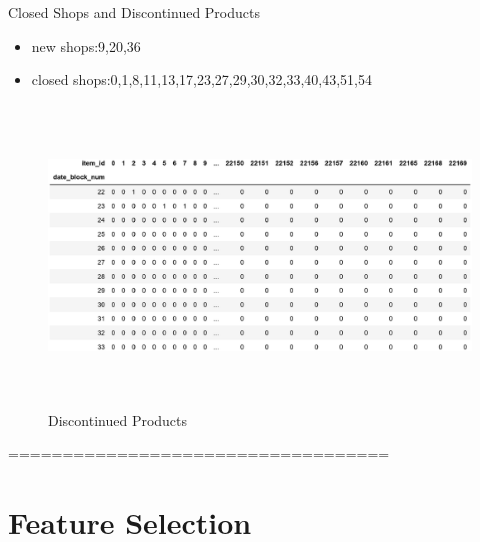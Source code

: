 \documentclass[
size=12pt,
paper=smartboard,  %
mode=present, 		%
display=slides, 	%
style=tuliplab,  	%
pauseslide,
fleqn,leqno]{powerdot}
\begin{document}
	\begin{slide}[toc=Closed Shops and Discontinued Products]{Closed Shops and Discontinued Products}
		
		\begin{itemize}
			\item new shops:9,20,36
			\item closed shops:0,1,8,11,13,17,23,27,29,30,32,33,40,43,51,54
		\end{itemize}
		\begin{figure}[htb]
			\centering
			\includegraphics[width=18cm, height=8cm]{figures/stopitems.eps}
			\caption{Discontinued Products
			}\label{straddltimeScale}
		\end{figure}
	\end{slide}
	===================================
	\section{Feature Selection}
	
\end{document}
